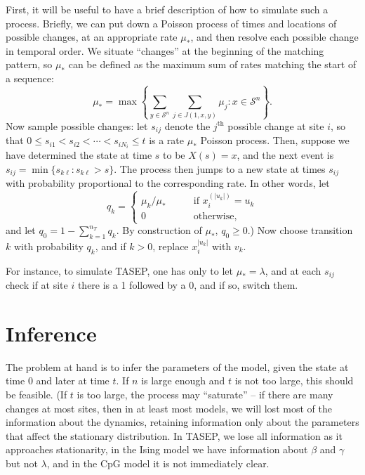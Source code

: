 \documentclass{article}
\newcommand{\calS}{\mathcal{S}}  %
\newcommand{\st}{\colon}  %
\theoremstyle{plain}
\theoremstyle{definition}
\begin{document}
First, it will be useful to have a brief description of how to simulate such a process.
Briefly, we can put down a Poisson process of times and locations of possible changes,
at an appropriate rate $\mu_*$,
and then resolve each possible change in temporal order.
We situate ``changes'' at the beginning of the matching pattern,
so $\mu_*$ can be defined as the maximum sum of rates matching  the start of a sequence:
\[
\mu_* = \max \left\{ \sum_{y \in \calS^n} \sum_{j\in J(1,x,y)} \mu_j \st x \in \calS^n \right\} .
\]
Now sample possible changes: let $s_{ij}$ denote the $j^\text{th}$ possible change at site $i$,
so that $0 \le s_{i1} < s_{i2} < \cdots < s_{iN_i} \le t$ is a rate $\mu_*$ Poisson process.
Then, suppose we have determined the state at time $s$ to be $X(s) = x$,
and the next event is $s_{ij} = \min \{ s_{k\ell} : s_{k\ell}>s \}$.
The process then jumps to a new state at times $s_{ij}$ with probability proportional to the corresponding rate.
In other words, let
\[
q_k = \begin{cases}
  \mu_k/\mu_* \qquad & \text{if } x_i^{(|u_k|)} = u_k  \\
  0 \qquad & \text{otherwise,}
\end{cases}
\]
and let $q_0 = 1-\sum_{k=1}^{n_T} q_k$.
By construction of $\mu_*$, $q_0\ge 0$.)
Now choose transition $k$ with probability $q_k$, and if $k>0$, replace $x_i^{|u_k|}$ with $v_k$.

For instance, to simulate TASEP, one has only to let $\mu_*=\lambda$, and at each $s_{ij}$
check if at site $i$ there is a 1 followed by a 0,
and if so, switch them.


\section{Inference}

The problem at hand is to infer the parameters of the model, given the state at time 0 and later at time $t$.
If $n$ is large enough and $t$ is not too large,
this should be feasible.
(If $t$ is too large, the process may ``saturate'' --
if there are many changes at most sites, then in at least most models, 
we will lost most of the information about the dynamics,
retaining information only about the parameters that affect the stationary distribution.
In TASEP, we lose all information as it approaches stationarity,
in the Ising model we have information about $\beta$ and $\gamma$ but not $\lambda$,
and in the CpG model it is not immediately clear.
\end{document}
